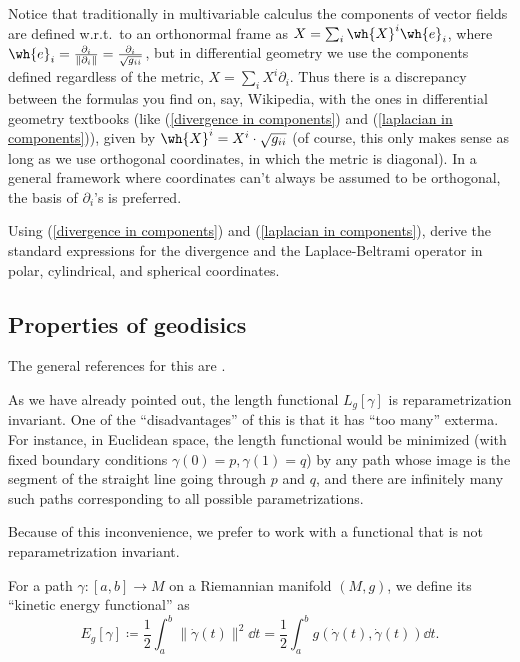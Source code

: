 \begin{rem}
    Notice that traditionally in multivariable calculus the components of vector fields are defined w.r.t.\ to an orthonormal frame as $X=\sum_i \wh{X}^i \wh{e}_i$, where $\wh{e}_i=\frac{\partial_i}{\lVert \partial_i\lVert}=\frac{\partial_i}{\sqrt{g_{ii}}}$, but in differential geometry we use the components defined regardless of the metric, $X=\sum_i X^i \partial_i$. Thus there is a discrepancy between the formulas you find on, say, Wikipedia, with the ones in differential geometry textbooks (like (\ref{divergence in components}) and (\ref{laplacian in components})), given by $\wh{X}^i=X^i\cdot \sqrt{g_{ii}}$ (of course, this only makes sense as long as we use orthogonal coordinates, in which the metric is diagonal). In a general framework where coordinates can't always be assumed to be orthogonal, the basis of $\partial_i$'s is preferred.
\end{rem}

\begin{xca}
    Using (\ref{divergence in components}) and (\ref{laplacian in components}), derive the standard expressions for the divergence and the Laplace-Beltrami operator in polar, cylindrical, and spherical  coordinates. 
\end{xca}




\subsection{Properties of geodisics}


The general references for this \subsect are \cite{Jost,Milnor}.

As we have already pointed out, the length functional $L_g[\gamma]$ is reparametrization invariant. One of the ``disadvantages'' of this is that it has ``too many'' exterma. For instance, in Euclidean space, the length functional would be minimized (with fixed boundary conditions $\gamma(0)=p,\gamma(1)=q$) by any path whose image is the segment of the straight line going through $p$ and $q$, and there are infinitely many such paths corresponding to all possible parametrizations.

Because of this inconvenience, we prefer to work with a functional that is not reparametrization invariant.

\begin{defn}
    For a path $\gamma:[a,b]\to M$ on a Riemannian manifold $(M,g)$, we define its ``kinetic energy functional'' as
    \[E_g[\gamma]\coloneqq \frac12 \int_a^b \lVert \dot\gamma(t)\rVert^2\dd t=\frac12 \int_a^b g(\dot\gamma(t),\dot\gamma(t))\dd t.\]
\end{defn}


